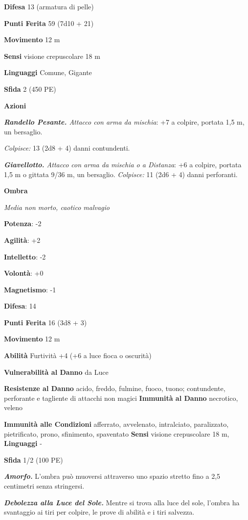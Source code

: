 \begin{multicols}{2}
\textbf{Difesa} 13 (armatura di pelle)

\textbf{Punti Ferita} 59 (7d10 + 21)

\textbf{Movimento} 12 m

\textbf{Sensi} visione crepuscolare 18 m

\textbf{Linguaggi} Comune, Gigante

\textbf{Sfida} 2 (450 PE)

\textbf{Azioni}

\emph{\textbf{Randello Pesante.} Attacco con arma da mischia}: +7 a
colpire, portata 1,5 m, un bersaglio.

\emph{Colpisce:} 13 (2d8 + 4) danni contundenti.

\emph{\textbf{Giavellotto.} Attacco con arma da mischia o a Distanza}:
+6 a colpire, portata 1,5 m o gittata 9/36 m, un bersaglio.
\emph{Colpisce:} 11 (2d6 + 4) danni perforanti.

\textbf{Ombra}

\emph{Media non morto, caotico malvagio}

\textbf{Potenza}: -2

\textbf{Agilità}: +2

\textbf{Intelletto}: -2

\textbf{Volontà}: +0

\textbf{Magnetismo}: -1

\textbf{Difesa}: 14

\textbf{Punti Ferita} 16 (3d8 + 3)

\textbf{Movimento} 12 m

\textbf{Abilità} Furtività +4 (+6 a luce fioca o oscurità)

\textbf{Vulnerabilità al Danno} da Luce

\textbf{Resistenze al Danno} acido, freddo, fulmine, fuoco, tuono;
contundente, perforante e tagliente di attacchi non magici
\textbf{Immunità al Danno} necrotico, veleno

\textbf{Immunità alle Condizioni} afferrato, avvelenato, intralciato,
paralizzato, pietrificato, prono, sfinimento, spaventato \textbf{Sensi}
visione crepuscolare 18 m,  \textbf{Linguaggi} -

\textbf{Sfida} 1/2 (100 PE)

\emph{\textbf{Amorfo.}} L'ombra può muoversi attraverso uno spazio
stretto fino a 2,5 centimetri senza stringersi.

\emph{\textbf{Debolezza alla Luce del Sole.}} Mentre si trova alla luce
del sole, l'ombra ha svantaggio ai tiri per colpire, le prove di abilità
e i tiri salvezza.


\end{multicols}
